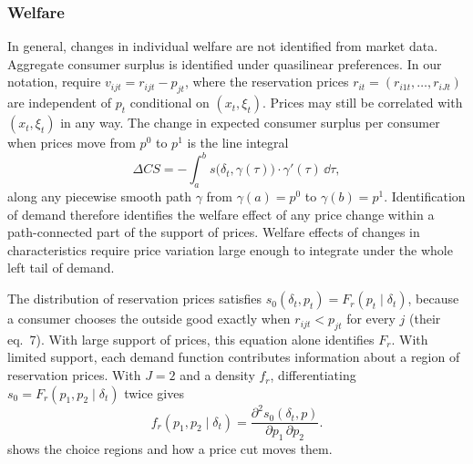 \subsubsection{Welfare}

In general, changes in individual welfare are not identified from market data. Aggregate consumer surplus
is identified under quasilinear preferences. In our notation, \citet[Assumption 5]{BerryHaile2014} require $v_{ijt} =
r_{ijt} - p_{jt}$, where the reservation prices $r_{it} = (r_{i1t}, \dots, r_{iJt})$ are independent of $p_t$
conditional on $(x_t, \xi_t)$. Prices may still be correlated with $(x_t, \xi_t)$ in any way. The change in
expected consumer surplus per consumer when prices move from $p^0$ to $p^1$ is the line integral
\begin{equation*}
  \Delta CS = -\int_a^b s\big(\delta_t, \gamma(\tau)\big)\cdot\gamma'(\tau)\, \dd\tau,
\end{equation*}
along any piecewise smooth path $\gamma$ from $\gamma(a) = p^0$ to $\gamma(b) = p^1$. Identification of demand
therefore identifies the welfare effect of any price change within a path-connected part of the support of
prices. Welfare effects of changes in characteristics require price variation large enough to integrate under
the whole left tail of demand.

The distribution of reservation prices satisfies $s_0(\delta_t, p_t) = F_r(p_t \mid \delta_t)$, because a
consumer chooses the outside good exactly when $r_{ijt} < p_{jt}$ for every $j$ (their eq.~7). With large
support of prices, this equation alone identifies $F_r$. With limited support, each demand function
contributes information about a region of reservation prices. With $J = 2$ and a density $f_r$,
differentiating $s_0 = F_r(p_1, p_2 \mid \delta_t)$ twice gives
\begin{equation*}
  f_r(p_1, p_2 \mid \delta_t) = \frac{\partial^2 s_0(\delta_t, p)}{\partial p_1\,\partial p_2}.
\end{equation*}
 shows the choice regions and how a price cut moves them.


